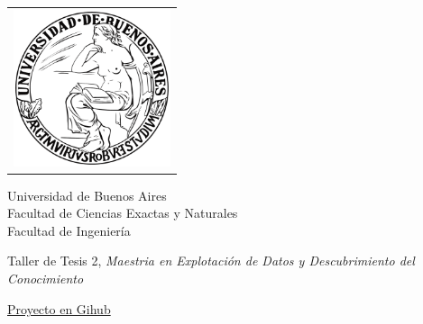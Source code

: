 \newcommand{\HRule}{\rule{\linewidth}{0.2mm}}
%
\thispagestyle{empty}

\begin{center}\leavevmode

\vspace{-2cm}

\begin{tabular}{l}
\includegraphics[width=4.6cm]{./images/logouba.png}
\end{tabular}


{\large \sc Universidad de Buenos Aires\\Facultad de Ciencias Exactas y Naturales \\ Facultad de Ingeniería}

\vspace{5.0cm}

\begin{huge}
\textbf{\tituloTesis}
\end{huge}

\vspace{2cm}

{\large Taller de Tesis 2, \textit{Maestria en Explotación de Datos y Descubrimiento del Conocimiento}}
\vspace{2cm}

{\large \href{https://github.com/adrianmarino/thesis-paper}{Proyecto en Gihub}}

\vspace{2cm}

{\Large \autor}

\end{center}

\vfill

{\large


\vspace{.2cm}


\vspace{.2cm}

\lugar
}

\newpage\thispagestyle{empty}
